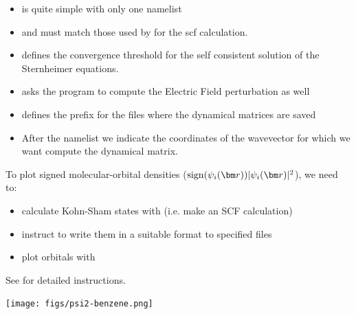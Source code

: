 \documentclass[landscape]{foils}
\begin{document}
\parbox{17cm}{
	\begin{itemize}
	\item {} is quite simple with only one namelist 
	\item {} and  must match those used by  for the scf calculation. 
	\item {} defines the convergence threshold for the self consistent solution of the Sternheimer equations. 
	\item {} asks the program to compute the Electric Field perturbation as well 
	\item {} defines the prefix for the files where the dynamical matrices are saved 
	\item After the namelist we indicate the coordinates of the wavevector for which we want compute the dynamical matrix. 
	\end{itemize}
}
\hskip 2cm
\parbox{8cm}{
}




To plot signed molecular-orbital densities
($\sign(\psi_i(\vr))|\psi_i(\vr)|^2$), we need to:
\begin{itemize}
\item calculate Kohn-Sham states with  (i.e. make an
  SCF calculation)
\item instruct  to write them in a suitable format to
  specified files
\item plot orbitals with 
\end{itemize}
See  for detailed instructions.
\vspace{-4cm}
\begin{flushright}
  \texttt{[image: figs/psi2-benzene.png]}  
\end{flushright}
\end{document}
